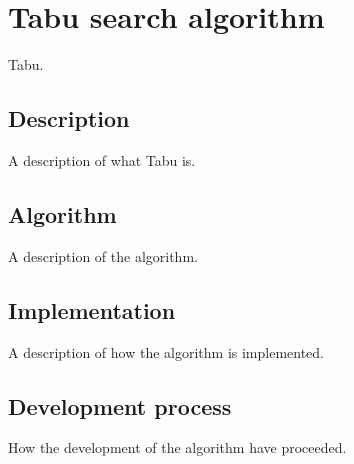 \section{Tabu search algorithm}
Tabu.
\subsection{Description}
A description of what Tabu is.
\subsection{Algorithm}
A description of the algorithm.
\subsection{Implementation}
A description of how the algorithm is implemented.
\subsection{Development process}
How the development of the algorithm have proceeded.